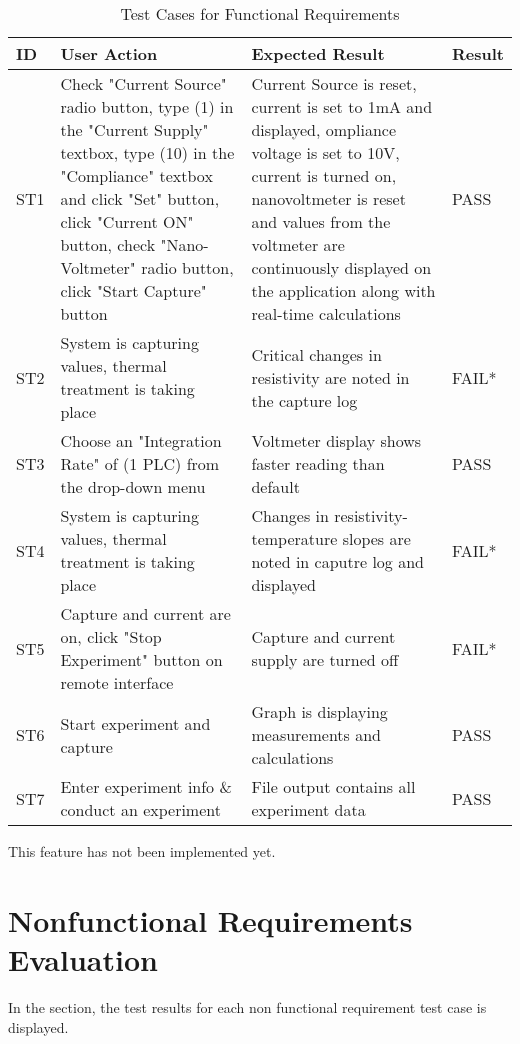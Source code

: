 \documentclass[12pt, titlepage]{article}
\begin{document}
\begin{table}[H]
	\centering
	\caption{Test Cases for Functional Requirements}
	\label{my-label}
	\begin{tabular}{|p{0.85cm}|p{5cm}|p{5cm}|p{1.3cm}|}
		\hline
		\textbf{ID} & \textbf{User Action} & \textbf{Expected Result}  & \textbf{Result} \\ \hline
		ST1 & Check "Current Source" radio button, type (1) in the "Current Supply" textbox, type (10) in the "Compliance" textbox and click "Set" button, click "Current ON" button, check "Nano-Voltmeter" radio button, click "Start Capture" button & Current Source is reset, current  is set to 1mA and displayed, ompliance voltage is set to 10V, current is turned on, nanovoltmeter is reset and values from the voltmeter are continuously displayed on the application along with real-time calculations & PASS\\ \hline
		ST2 & System is capturing values, thermal treatment is taking place & Critical changes in resistivity are noted in the capture log & FAIL*\\ \hline
		ST3 & Choose an "Integration Rate" of (1 PLC) from the drop-down menu & Voltmeter display shows faster reading than default & PASS\\ \hline
		ST4 & System is capturing values, thermal treatment is taking place & Changes in resistivity-temperature slopes are noted in caputre log and displayed & FAIL*\\ \hline
		ST5 & Capture and current are on, click "Stop Experiment" button on remote interface & Capture and current supply are turned off & FAIL* \\ \hline
		ST6 & Start experiment and capture & Graph is displaying measurements and calculations & PASS \\ \hline
		ST7 & Enter experiment info \& conduct an experiment & File output contains all experiment data & PASS \\ \hline
	\end{tabular}
\end{table}
\noindent * This feature has not been implemented yet.

\newpage

\section{Nonfunctional Requirements Evaluation}

In the section, the test results for each non functional requirement test case is displayed.
\end{document}

